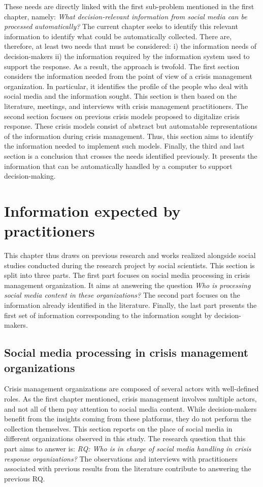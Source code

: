 These needs are directly linked with the first sub-problem mentioned in the first chapter, namely: \emph{What decision-relevant information from social media can be processed automatically?}
The current chapter seeks to identify this relevant information to identify what could be automatically collected.
There are, therefore, at least two needs that must be considered: i) the information needs of decision-makers ii) the information required by the information system used to support the response.
As a result, the approach is twofold.
The first section considers the information needed from the point of view of a crisis management organization.
In particular, it identifies the profile of the people who deal with social media and the information sought.
This section is then based on the literature, meetings, and interviews with crisis management practitioners.
The second section focuses on previous crisis models proposed to digitalize crisis response.
These crisis models consist of abstract but automatable representations of the information during crisis management.
Thus, this section aims to identify the information needed to implement such models.
Finally, the third and last section is a conclusion that crosses the needs identified previously.
It presents the information that can be automatically handled by a computer to support decision-making.

\section{Information expected by practitioners}
This chapter thus draws on previous research and works realized alongside social studies conducted during the research project by social scientists.
This section is split into three parts.
The first part focuses on social media processing in crisis management organization.
It aims at answering the question \textit{Who is processing social media content in these organizations?}
The second part focuses on the information already identified in the literature.
Finally, the last part presents the first set of information corresponding to the information sought by decision-makers.

\subsection{Social media processing in crisis management organizations}
Crisis management organizations are composed of several actors with well-defined roles.
As the first chapter mentioned, crisis management involves multiple actors, and not all of them pay attention to social media content.
While decision-makers benefit from the insights coming from these platforms, they do not perform the collection themselves.
This section reports on the place of social media in different organizations observed in this study.
The research question that this part aims to answer is:
\emph{RQ: Who is in charge of social media handling in crisis response organizations?}
The observations and interviews with practitioners associated with previous results from the literature contribute to answering the previous RQ.

